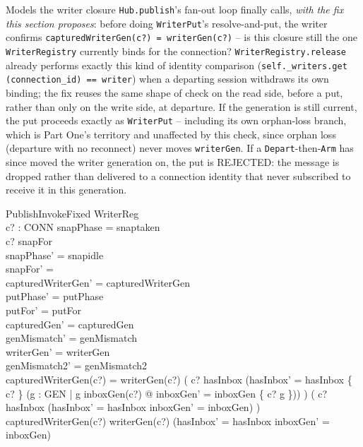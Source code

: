 \documentclass[a4paper,10pt,fleqn]{article}
\begin{document}
Models the writer closure \texttt{Hub.publish}'s fan-out loop finally calls,
\emph{with the fix this section proposes}: before doing \texttt{WriterPut}'s
resolve-and-put, the writer confirms \texttt{capturedWriterGen(c?) =
writerGen(c?)} -- is this closure still the one \texttt{WriterRegistry}
currently binds for the connection? \texttt{WriterRegistry.release} already
performs exactly this kind of identity comparison (\texttt{self.\_writers.get
(connection\_id) == writer}) when a departing session withdraws its own
binding; the fix reuses the same shape of check on the read side, before a
put, rather than only on the write side, at departure. If the generation is
still current, the put proceeds exactly as \texttt{WriterPut} -- including
its own orphan-loss branch, which is Part One's territory and unaffected
by this check, since orphan loss (departure with no reconnect) never moves
\texttt{writerGen}. If a \texttt{Depart}-then-\texttt{Arm} has since moved
the writer generation on, the put is REJECTED: the message is dropped rather
than delivered to a connection identity that never subscribed to receive it
in this generation.

\begin{schema}{PublishInvokeFixed}
  \Delta WriterReg \\
  c? : CONN
\where
  snapPhase = snaptaken \\
  c? \in snapFor \\
  snapPhase' = snapidle \\
  snapFor' = \emptyset \\
  capturedWriterGen' = capturedWriterGen \\
  putPhase' = putPhase \\
  putFor' = putFor \\
  capturedGen' = capturedGen \\
  genMismatch' = genMismatch \\
  writerGen' = writerGen \\
  genMismatch2' = genMismatch2 \\
  capturedWriterGen(c?) = writerGen(c?) \implies
    ( c? \notin hasInbox \implies
        (hasInbox' = hasInbox \cup \{ c? \} \land
         (\exists g : GEN | g \neq inboxGen(c?) @
           inboxGen' = inboxGen \oplus \{ c? \mapsto g \})) ) \land
    ( c? \in hasInbox \implies
        (hasInbox' = hasInbox \land inboxGen' = inboxGen) ) \\
  capturedWriterGen(c?) \neq writerGen(c?) \implies
    (hasInbox' = hasInbox \land inboxGen' = inboxGen)
\end{schema}
\end{document}
